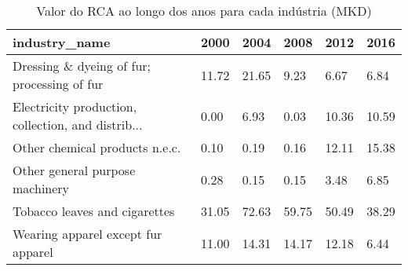 \begin{table}
\centering
\caption{Valor do RCA ao longo dos anos para cada indústria (MKD)}
\begin{tabular}{p{6cm}p{1.5cm}p{1.5cm}p{1.5cm}p{1.5cm}p{1.5cm}}
\toprule
                                     industry\_name &  2000 &  2004 &  2008 &  2012 &  2016 \\
\midrule
       Dressing \& dyeing of fur; processing of fur & 11.72 & 21.65 &  9.23 &  6.67 &  6.84 \\
Electricity production, collection, and distrib... &  0.00 &  6.93 &  0.03 & 10.36 & 10.59 \\
                    Other chemical products n.e.c. &  0.10 &  0.19 &  0.16 & 12.11 & 15.38 \\
                   Other general purpose machinery &  0.28 &  0.15 &  0.15 &  3.48 &  6.85 \\
                     Tobacco leaves and cigarettes & 31.05 & 72.63 & 59.75 & 50.49 & 38.29 \\
                Wearing apparel except fur apparel & 11.00 & 14.31 & 14.17 & 12.18 &  6.44 \\
\bottomrule
\end{tabular}
\end{table}
